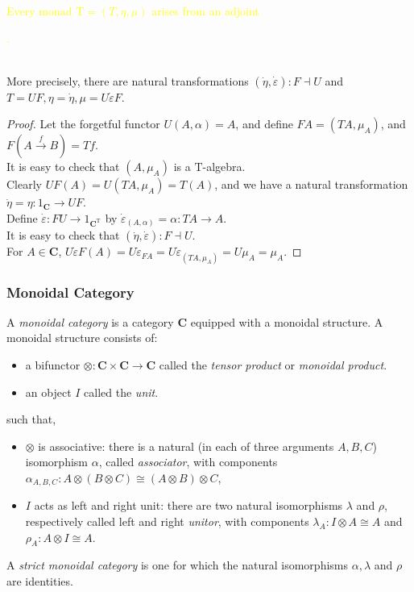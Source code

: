 \documentclass[UTF8,11pt,colorlinks,compress,openany]{beamer}%
\begin{document}
\begin{frame}\frametitle{}
\begin{theorem}
\textcolor{yellow}{Every monad $\mathrm{T}=(T,\eta,\mu)$ arises from an adjoint .}\\
More precisely, there are natural transformations $(\dot{\eta},\dot{\varepsilon}): F\dashv U$ and $T=UF, \eta=\dot{\eta}, \mu=U\dot{\varepsilon} F$.
\end{theorem}
\begin{proof}
Let the forgetful functor $U(A,\alpha)=A$, and define $FA=(TA,\mu_A)$, and $F(A\xrightarrow{f} B)=Tf$.\\
It is easy to check that $(A,\mu_A)$ is a $\mathrm{T}$-algebra.\\
Clearly $UF(A)=U(TA,\mu_A)=T(A)$, and we have a natural transformation $\dot{\eta}=\eta: 1_\mathbf{C}\to UF$.\\
Define $\dot{\varepsilon}: FU\to 1_{\mathbf{C}^\mathrm{T}}$ by $\dot{\varepsilon}_{(A,\alpha)}=\alpha: TA\to A$.\\
It is easy to check that $(\dot{\eta},\dot{\varepsilon}): F\dashv U$.\\
For $A\in\mathbf{C}$,
$U\dot{\varepsilon} F(A)=U\dot{\varepsilon}_{FA}=U\dot{\varepsilon}_{(TA,\mu_A)}=U\mu_A=\mu_A$.
\end{proof}
\end{frame}

\begin{frame}\frametitle{Monoidal Category}
\begin{definition}
A \emph{monoidal category} is a category $\mathbf{C}$ equipped with a monoidal structure. A monoidal structure consists of:
\begin{itemize}
	\item a bifunctor $\otimes:\mathbf{C}\times\mathbf{C}\to\mathbf{C}$ called the \emph{tensor product} or \emph{monoidal product}.
	\item an object $I$ called the \emph{unit}.
\end{itemize} such that,
\begin{itemize}
	\item $\otimes$ is associative: there is a natural (in each of three arguments $A,B,C$) isomorphism $\alpha$, called \emph{associator}, with components $\alpha_{A,B,C}: A\otimes (B\otimes C)\cong (A\otimes B)\otimes C$,
	\item $I$ acts as left and right unit: there are two natural isomorphisms $\lambda$ and $\rho$, respectively called left and right \emph{unitor}, with components $\lambda_A: I\otimes A\cong A$ and $\rho_A: A\otimes I\cong A$.
\end{itemize}
\end{definition}
A \emph{strict monoidal category} is one for which the natural isomorphisms $\alpha,\lambda$ and $\rho$ are identities.
\end{frame}
\end{document}
